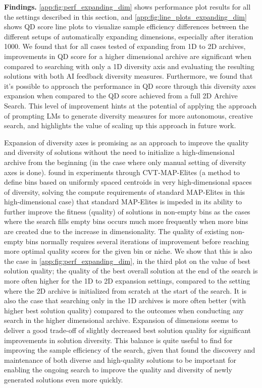 \textbf{Findings.} \cref{app:fig:perf_expanding_dim} shows performance plot results for all the settings described in this section, and \cref{app:fig:line_plots_expanding_dim} shows QD score line plots to visualize sample efficiency differences between the different setups of automatically expanding dimensions, especially after iteration 1000. We found that for all cases tested of expanding from 1D to 2D archives, improvements in QD score for a higher dimensional archive are significant when compared to searching with only a 1D diversity axis and evaluating the resulting solutions with both AI feedback diversity measures. Furthermore, we found that it’s possible to approach the performance in QD score through this diversity axes expansion when compared to the QD score achieved from a full 2D Archive Search. This level of improvement hints at the potential of applying the approach of prompting LMs to generate diversity measures for more autonomous, creative search, and highlights the value of scaling up this approach in future work.

Expansion of diversity axes is promising as an approach to improve the quality and diversity of solutions without the need to initialize a high-dimensional archive from the beginning (in the case where only manual setting of diversity axes is done). \citet{vassiliades2016scaling} found in experiments through CVT-MAP-Elites (a method to define bins based on uniformly spaced centroids in very high-dimensional spaces of diversity, solving the compute requirements of standard MAP-Elites in this high-dimensional case) that standard MAP-Elites is impeded in its ability to further improve the fitness (quality) of solutions in non-empty bins as the cases where the search fills empty bins occurs much more frequently when more bins are created due to the increase in dimensionality. The quality of existing non-empty bins normally requires several iterations of improvement before reaching more optimal quality scores for the given bin or niche. We show that this is also the case in \cref{app:fig:perf_expanding_dim}, in the third plot on the value of best solution quality; the quality of the best overall solution at the end of the search is more often higher for the 1D to 2D expansion settings, compared to the setting where the 2D archive is initialized from scratch at the start of the search. It is also the case that searching only in the 1D archives is more often better (with higher best solution quality) compared to the outcomes when conducting any search in the higher dimensional archive. Expansion of dimensions seems to deliver a good trade-off of slightly decreased best solution quality for significant improvements in solution diversity. This balance is quite useful to find for improving the sample efficiency of the search, given that \citet{mouret2015illuminating} found the discovery and maintenance of both diverse and high-quality solutions to be important for enabling the ongoing search to improve the quality and diversity of newly generated solutions even more quickly.

